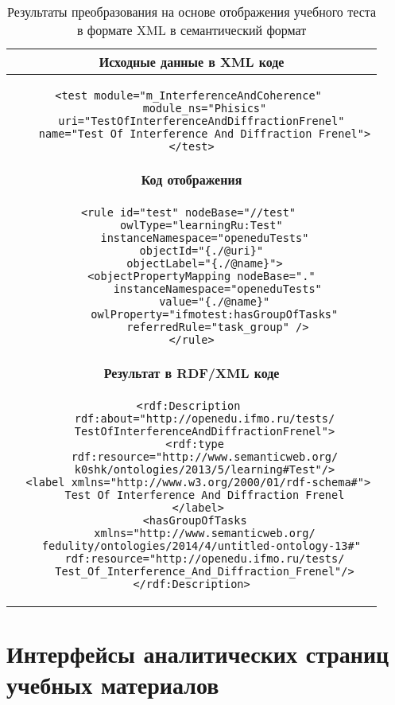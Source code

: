 \begin{table}[h!]
\centering
\caption{Результаты преобразования на основе отображения учебного теста в формате XML в семантический формат}
\label{table:1}

\begin{tabular}{ |c|  }
  \hline
 \textbf{Исходные данные в XML коде}
 \\
 \hline
 \begin{lstlisting}
<test module="m_InterferenceAndCoherence" 
    module_ns="Phisics"
    uri="TestOfInterferenceAndDiffractionFrenel" 
    name="Test Of Interference And Diffraction Frenel">
</test>
 \end{lstlisting}
 \\
 \hline
  \textbf{Код отображения}
  \\
  \hline
\begin{lstlisting}
<rule id="test" nodeBase="//test" 
    owlType="learningRu:Test" 
    instanceNamespace="openeduTests"
    objectId="{./@uri}" 
    objectLabel="{./@name}">
    <objectPropertyMapping nodeBase="." 
        instanceNamespace="openeduTests"
        value="{./@name}" 
        owlProperty="ifmotest:hasGroupOfTasks" 
        referredRule="task_group" />
</rule>
\end{lstlisting}
    \\
 \hline
\textbf{Результат в RDF/XML коде}
\\
  \hline
  \begin{lstlisting}
<rdf:Description 
    rdf:about="http://openedu.ifmo.ru/tests/
    TestOfInterferenceAndDiffractionFrenel">
  <rdf:type 
    rdf:resource="http://www.semanticweb.org/
    k0shk/ontologies/2013/5/learning#Test"/>
  <label xmlns="http://www.w3.org/2000/01/rdf-schema#">
    Test Of Interference And Diffraction Frenel
  </label>
  <hasGroupOfTasks 
    xmlns="http://www.semanticweb.org/
    fedulity/ontologies/2014/4/untitled-ontology-13#" 
    rdf:resource="http://openedu.ifmo.ru/tests/
    Test_Of_Interference_And_Diffraction_Frenel"/>
</rdf:Description>
\end{lstlisting}

\\
 \hline
\end{tabular}

\end{table}

\clearpage


\chapter{Интерфейсы аналитических страниц учебных материалов} \label{APP_C}


